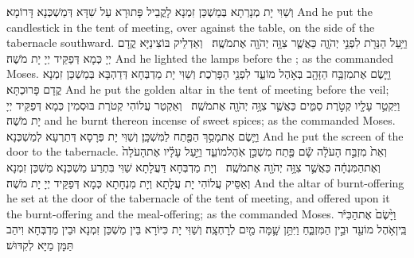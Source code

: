 {וְשַׁוִּי יָת מְנָרְתָא בְּמַשְׁכַּן זִמְנָא לָקֳבֵיל פָּתוּרָא עַל שִׁדָּא דְּמַשְׁכְּנָא דָּרוֹמָא׃}
{And he put the candlestick in the tent of meeting, over against the table, on the side of the tabernacle southward.}{}
{וַיַּ֥עַל הַנֵּרֹ֖ת לִפְנֵ֣י יְהֹוָ֑ה כַּאֲשֶׁ֛ר צִוָּ֥ה יְהֹוָ֖ה אֶת\maqqaf מֹשֶֽׁה׃ \setuma }
{וְאַדְלֵיק בּוֹצִינַיָּא קֳדָם יְיָ כְּמָא דְּפַקֵּיד יְיָ יָת מֹשֶׁה׃}
{And he lighted the lamps before the \lord; as the \lord\space commanded Moses.}{}
{וַיָּ֛שֶׂם אֶת\maqqaf מִזְבַּ֥ח הַזָּהָ֖ב בְּאֹ֣הֶל מוֹעֵ֑ד לִפְנֵ֖י הַפָּרֹֽכֶת׃}
{וְשַׁוִּי יָת מַדְבְּחָא דְּדַהְבָּא בְּמַשְׁכַּן זִמְנָא קֳדָם פָּרוּכְתָּא׃}
{And he put the golden altar in the tent of meeting before the veil;}{}
{וַיַּקְטֵ֥ר עָלָ֖יו קְטֹ֣רֶת סַמִּ֑ים כַּאֲשֶׁ֛ר צִוָּ֥ה יְהֹוָ֖ה אֶת\maqqaf מֹשֶֽׁה׃ \setuma }
{וְאַקְטַר עֲלוֹהִי קְטֹרֶת בּוּסְמִין כְּמָא דְּפַקֵּיד יְיָ יָת מֹשֶׁה׃}
{and he burnt thereon incense of sweet spices; as the \lord\space commanded Moses.}{}
{וַיָּ֛שֶׂם אֶת\maqqaf מָסַ֥ךְ הַפֶּ֖תַח לַמִּשְׁכָּֽן׃}
{וְשַׁוִּי יָת פְּרָסָא דְּתַרְעָא לְמַשְׁכְּנָא׃}
{And he put the screen of the door to the tabernacle.}{}
{וְאֵת֙ מִזְבַּ֣ח הָעֹלָ֔ה שָׂ֕ם פֶּ֖תַח מִשְׁכַּ֣ן אֹֽהֶל\maqqaf מוֹעֵ֑ד וַיַּ֣עַל עָלָ֗יו אֶת\maqqaf הָעֹלָה֙ וְאֶת\maqqaf הַמִּנְחָ֔ה כַּאֲשֶׁ֛ר צִוָּ֥ה יְהֹוָ֖ה אֶת\maqqaf מֹשֶֽׁה׃ \setuma }
{וְיָת מַדְבְּחָא דַּעֲלָתָא שַׁוִּי בִּתְרַע מַשְׁכְּנָא מַשְׁכַּן זִמְנָא וְאַסֵּיק עֲלוֹהִי יָת עֲלָתָא וְיָת מִנְחָתָא כְּמָא דְּפַקֵּיד יְיָ יָת מֹשֶׁה׃}
{And the altar of burnt-offering he set at the door of the tabernacle of the tent of meeting, and offered upon it the burnt-offering and the meal-offering; as the \lord\space commanded Moses.}{}
{וַיָּ֙שֶׂם֙ אֶת\maqqaf הַכִּיֹּ֔ר בֵּֽין\maqqaf אֹ֥הֶל מוֹעֵ֖ד וּבֵ֣ין הַמִּזְבֵּ֑חַ וַיִּתֵּ֥ן שָׁ֛מָּה מַ֖יִם לְרׇחְצָֽה׃}
{וְשַׁוִּי יָת כִּיּוֹרָא בֵּין מַשְׁכַּן זִמְנָא וּבֵין מַדְבְּחָא וִיהַב תַּמָּן מַיָּא לְקִדּוּשׁ׃}
